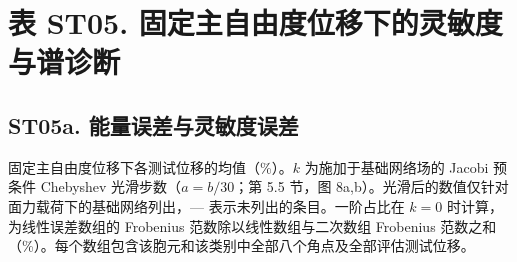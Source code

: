 \documentclass[preprint,12pt,authoryear]{elsarticle}
\begin{document}
\section{表 ST05. 固定主自由度位移下的灵敏度与谱诊断}

\subsection{ST05a. 能量误差与灵敏度误差}

固定主自由度位移下各测试位移的均值（\%）。\(k\) 为施加于基础网络场的 Jacobi 预条件 Chebyshev 光滑步数（\(a=b/30\)；第 5.5 节，图 8a,b）。光滑后的数值仅针对面力载荷下的基础网络列出，--- 表示未列出的条目。一阶占比在 \(k=0\) 时计算，为线性误差数组的 Frobenius 范数除以线性数组与二次数组 Frobenius 范数之和（\%）。每个数组包含该胞元和该类别中全部八个角点及全部评估测试位移。
\end{document}
